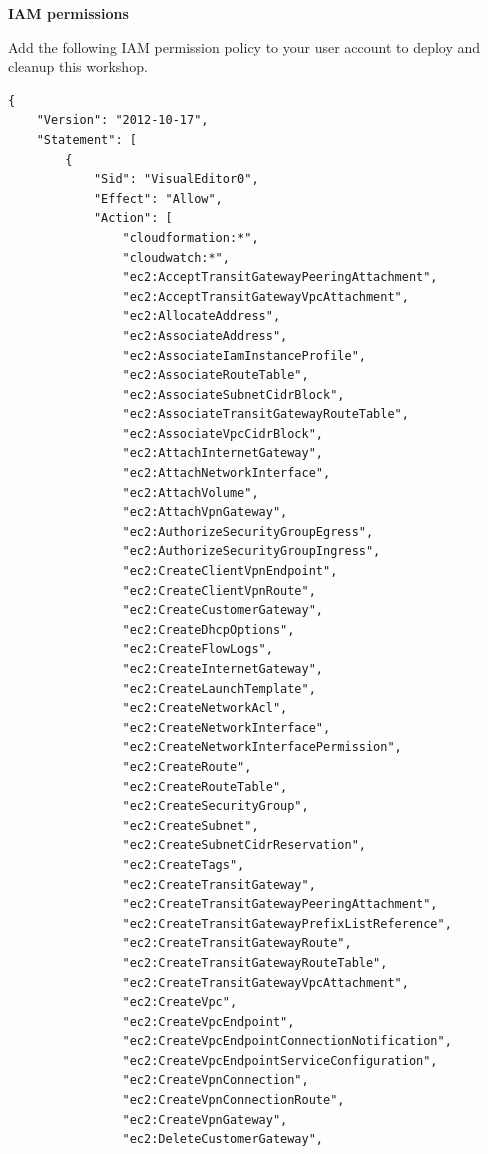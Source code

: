 \vspace{0.5em}\noindent\textbf{IAM permissions}

Add the following IAM permission policy to your user account to deploy
and cleanup this workshop.

\begin{verbatim}
{
    "Version": "2012-10-17",
    "Statement": [
        {
            "Sid": "VisualEditor0",
            "Effect": "Allow",
            "Action": [
                "cloudformation:*",
                "cloudwatch:*",
                "ec2:AcceptTransitGatewayPeeringAttachment",
                "ec2:AcceptTransitGatewayVpcAttachment",
                "ec2:AllocateAddress",
                "ec2:AssociateAddress",
                "ec2:AssociateIamInstanceProfile",
                "ec2:AssociateRouteTable",
                "ec2:AssociateSubnetCidrBlock",
                "ec2:AssociateTransitGatewayRouteTable",
                "ec2:AssociateVpcCidrBlock",
                "ec2:AttachInternetGateway",
                "ec2:AttachNetworkInterface",
                "ec2:AttachVolume",
                "ec2:AttachVpnGateway",
                "ec2:AuthorizeSecurityGroupEgress",
                "ec2:AuthorizeSecurityGroupIngress",
                "ec2:CreateClientVpnEndpoint",
                "ec2:CreateClientVpnRoute",
                "ec2:CreateCustomerGateway",
                "ec2:CreateDhcpOptions",
                "ec2:CreateFlowLogs",
                "ec2:CreateInternetGateway",
                "ec2:CreateLaunchTemplate",
                "ec2:CreateNetworkAcl",
                "ec2:CreateNetworkInterface",
                "ec2:CreateNetworkInterfacePermission",
                "ec2:CreateRoute",
                "ec2:CreateRouteTable",
                "ec2:CreateSecurityGroup",
                "ec2:CreateSubnet",
                "ec2:CreateSubnetCidrReservation",
                "ec2:CreateTags",
                "ec2:CreateTransitGateway",
                "ec2:CreateTransitGatewayPeeringAttachment",
                "ec2:CreateTransitGatewayPrefixListReference",
                "ec2:CreateTransitGatewayRoute",
                "ec2:CreateTransitGatewayRouteTable",
                "ec2:CreateTransitGatewayVpcAttachment",
                "ec2:CreateVpc",
                "ec2:CreateVpcEndpoint",
                "ec2:CreateVpcEndpointConnectionNotification",
                "ec2:CreateVpcEndpointServiceConfiguration",
                "ec2:CreateVpnConnection",
                "ec2:CreateVpnConnectionRoute",
                "ec2:CreateVpnGateway",
                "ec2:DeleteCustomerGateway",

\end{verbatim}
